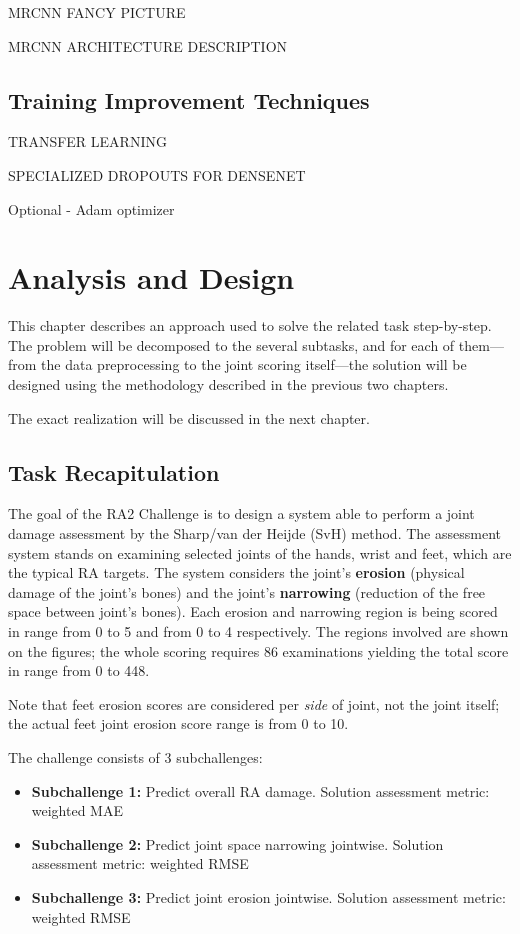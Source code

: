 \documentclass[thesis=B,english]{FITthesis}[2019/12/23]
\begin{document}
MRCNN FANCY PICTURE

MRCNN ARCHITECTURE DESCRIPTION

\section{Training Improvement Techniques}
TRANSFER LEARNING

SPECIALIZED DROPOUTS FOR DENSENET

Optional - Adam optimizer

\chapter{Analysis and Design}

This chapter describes an approach used to solve the related task step-by-step. The problem will be decomposed to the several subtasks, and for each of them---from the data preprocessing to the joint scoring itself---the solution will be designed using the methodology described in the previous two chapters.

The exact realization will be discussed in the next chapter.

\section{Task Recapitulation}

The goal of the RA2 Challenge is to design a system able to perform a joint damage assessment by the Sharp/van der Heijde (SvH) method. The assessment system stands on examining selected joints of the hands, wrist and feet, which are the typical RA targets. The system considers the joint's \textbf{erosion} (physical damage of the joint's bones) and the joint's \textbf{narrowing} (reduction of the free space between joint's bones). Each erosion and narrowing region is being scored in range from 0 to 5 and from 0 to 4 respectively. The regions involved are shown on the figures; the whole scoring requires 86 examinations yielding the total score in range from 0 to 448.

Note that feet erosion scores are considered per \textit{side} of joint, not the joint itself; the actual feet joint erosion score range is from 0 to 10.

The challenge consists of 3 subchallenges:
\begin{itemize}
	\item \textbf{Subchallenge 1:} Predict overall RA damage. Solution assessment metric: weighted MAE
	\item \textbf{Subchallenge 2:} Predict joint space narrowing jointwise. Solution assessment metric: weighted RMSE
	\item \textbf{Subchallenge 3:} Predict joint erosion jointwise. Solution assessment metric: weighted RMSE
\end{itemize}
\end{document}
